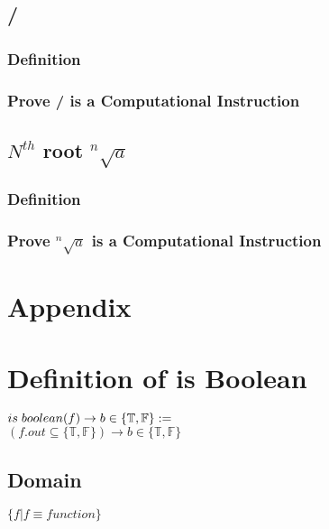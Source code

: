 \documentclass[11pt]{article}
\begin{document}
\subsection{/}
\subsubsection{Definition}
\subsubsection{Prove / is a Computational Instruction}







\subsection{$N^{th}$ root $^n \sqrt{a}$}
\subsubsection{Definition}
\subsubsection{Prove $^n \sqrt{a}$  is a Computational Instruction}






\section*{Appendix}

\section{Definition of is Boolean}
\begin{center}
$
is \hspace{1mm} boolean(f) \rightarrow b \in \{\mathbb{T},\mathbb{F}\} :=
$
\\ \vspace{2mm}
$
(f.out \subseteq \{\mathbb{T},\mathbb{F}\}) \rightarrow b \in \{\mathbb{T},\mathbb{F}\}
$
\end{center}


\subsection{Domain}
\begin{center}
$
\{f | f \equiv function\}
$
\end{center}
\end{document}
